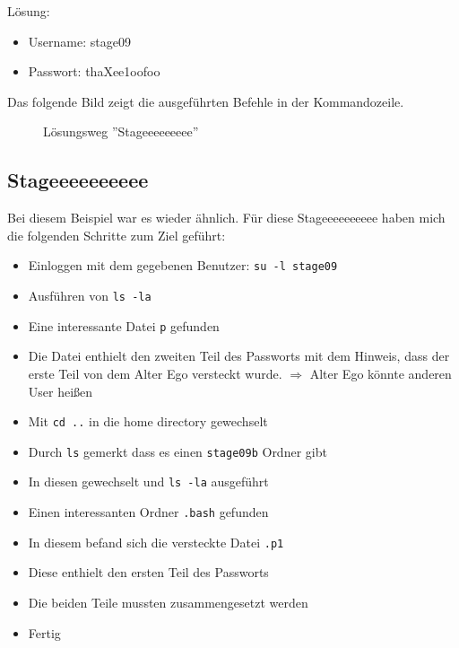 \documentclass[12pt, a4paper, titlepage, oneside]{scrartcl}
\begin{document}
	Lösung:
	\begin{itemize}
		\item Username: stage09

		\item Passwort: thaXee1oofoo
	\end{itemize}

	Das folgende Bild zeigt die ausgeführten Befehle in der Kommandozeile.

	\begin{figure}[h!]
		\centering
		\caption{Lösungsweg ''Stageeeeeeeee''}
		\label{fig:stageeeeeeeee_solution}
	\end{figure}

	\newpage

	\subsection{Stageeeeeeeeee}
	Bei diesem Beispiel war es wieder ähnlich. Für diese Stageeeeeeeeee haben mich
	die folgenden Schritte zum Ziel geführt:

	\begin{itemize}
		\item Einloggen mit dem gegebenen Benutzer: \lstinline{su -l stage09}

		\item Ausführen von \lstinline{ls -la}

		\item Eine interessante Datei \lstinline{p} gefunden

		\item Die Datei enthielt den zweiten Teil des Passworts mit dem Hinweis,
			dass der erste Teil von dem Alter Ego versteckt wurde. $\Rightarrow$ Alter
			Ego könnte anderen User heißen

		\item Mit \lstinline{cd ..} in die home directory gewechselt

		\item Durch \lstinline{ls} gemerkt dass es einen \lstinline{stage09b} Ordner
			gibt

		\item In diesen gewechselt und \lstinline{ls -la} ausgeführt

		\item Einen interessanten Ordner \lstinline{.bash} gefunden

		\item In diesem befand sich die versteckte Datei \lstinline{.p1}

		\item Diese enthielt den ersten Teil des Passworts

		\item Die beiden Teile mussten zusammengesetzt werden

		\item Fertig
	\end{itemize}
\end{document}
